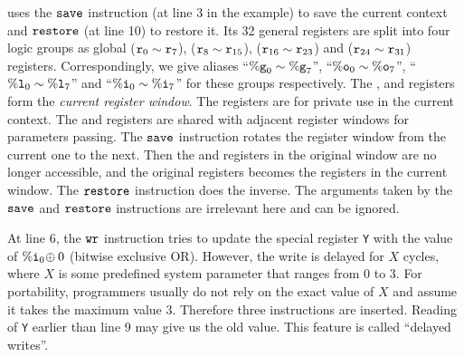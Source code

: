 \sparc{} uses the $\texttt{save}$ instruction (at line 3 in the example)
to save the current context
and $\texttt{restore}$ (at line 10) to restore it.
Its 32 general registers are split into four
logic groups
as \textsf{global} ($\texttt{r}_{0} \sim \texttt{r}_{7}$),
\outRN{} ($\texttt{r}_{8} \sim \texttt{r}_{15}$),
\localRN{} ($\texttt{r}_{16} \sim \texttt{r}_{23}$) and
\inRN{} ($\texttt{r}_{24} \sim \texttt{r}_{31}$) registers.
Correspondingly, we give aliases ``$\%\texttt{g}_{0} \sim \%\texttt{g}_{7}$'',
``$\%\texttt{o}_{0} \sim \%\texttt{o}_{7}$'', ``$\%\texttt{l}_{0} \sim \%\texttt{l}_{7}$''
and ``$\%\texttt{i}_{0} \sim \%\texttt{i}_{7}$'' for these groups
respectively.
The \outRN{}, \localRN{} and \inRN{} registers form the
{\em current register window}.
The \localRN{} registers are for private use in the current context.
The \inRN{} and \outRN{} registers are shared with adjacent register windows
for parameters passing.
The $\texttt{save}$ instruction rotates the register window from the
current one to the next. Then the \localRN{} and \inRN{}
registers in the original window are no longer accessible,
and the original \outRN{} registers becomes the \inRN{} registers
in the current window.
The $\texttt{restore}$ instruction does the inverse.
The arguments taken by the $\texttt{save}$ and  $\texttt{restore}$ instructions
are irrelevant here and can be ignored.


At line 6, the $\texttt{wr}$ instruction tries to
update the special register {\tt Y}
with the value of $\%\texttt{i}_{0} \! \oplus 0$ 
(bitwise exclusive OR).
However, the write is delayed for $X$ cycles, 
where $X$ is some predefined system parameter 
that ranges from 0 to 3.
For portability, programmers usually do not rely
on the exact value of $X$ and assume it takes
the maximum value 3.
Therefore three \nop{} instructions
are inserted.
Reading of {\tt Y} earlier than line 9
may give us the old value.
This feature is called ``delayed writes''.

